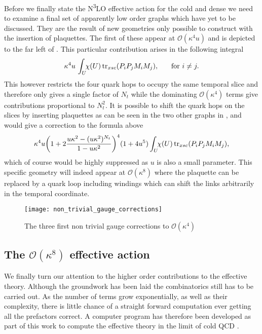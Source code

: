 Before we finally state the N\textsuperscript{3}LO effective action for the cold
and dense we need to examine a final set of apparently low order graphs which
have yet to be discussed. They are the result of new geometries only possible to
construct with the insertion of plaquettes. The first of these appear at
$\mathcal{O}(\kappa^4 u)$ and is depicted to the far left of
. This particular contribution arises in the
following integral
%
\begin{equation}
  \kappa^4 u\, \int_{\mathrlap{U}} \hskip .1cm \chi(U) \tr_{xsc} (P_i P_j M_i M_j), \hskip.5cm \text{ for } i \neq j.
\end{equation}
%
This however restricts the four quark hops to occupy the same temporal slice and
therefore only gives a single factor of $N_t$ while the dominating
$\mathcal{O}(\kappa^4)$ terms give contributions proportional to $N_t^2$. It is
possible to shift the quark hops on the slices by inserting plaquettes as can be
seen in the two other graphs in , and would give a
correction to the formula above
%
\begin{equation}
  \kappa^4 u \bigg(1 + 2 \frac{u \kappa^2 - (u\kappa^2)^{N_t}}{1 - u\kappa^2} \bigg)^4 (1 + 4 u^5)
    \int_{\mathrlap{U}} \hskip .1cm \chi(U) \tr_{xsc} (P_i P_j M_i M_j),
\end{equation}
%
which of course would be highly suppressed as $u$ is also a small parameter.
This specific geometry will indeed appear at $\mathcal{O}(\kappa^8)$ where the
plaquette can be replaced by a quark loop including windings which can shift the
links arbitrarily in the temporal coordinate.

\begin{figure}
  {\centering
    \texttt{[image: non\_trivial\_gauge\_corrections]}\par}
  \caption{The three first non trivial gauge corrections to
    $\mathcal{O}(\kappa^4)$}
  \label{fig:nontrivial-gauge}
\end{figure}

\subsection{The \texorpdfstring{$\mathcal{O}(\kappa^8)$}{O(k8)} effective action}

We finally turn our attention to the higher order contributions to the effective
theory. Although the groundwork has been laid the combinatorics still has to be
carried out. As the number of terms grow exponentially, as well as their
complexity, there is little chance of a straight forward computation ever
getting all the prefactors correct. A computer program has therefore been
developed as part of this work to compute the effective theory in the limit of
cold QCD \citep{jonas_rylund_glesaaen_2016_56319}.

